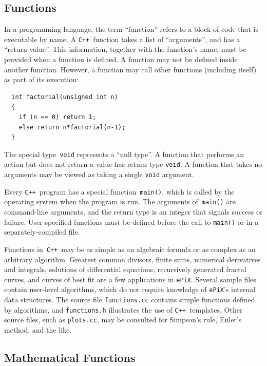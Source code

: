 \documentclass[12pt,letterpaper]{book}
\newcommand{\code}[1]{\texttt{#1}}
\newcommand{\filename}[1]{\texttt{#1}}
\newcommand{\ePiX}{\code{ePiX}}
\newcommand{\CXX}{\code{C++}}
\begin{document}
\subsection{Functions}

In a programming language, the term ``function'' refers to a block of
code that is executable by name.  A \CXX\ function takes a list of
``arguments'', and has a ``return value''.  This information, together
with the function's name, must be provided when a function is defined.
A function may not be defined inside another function. However, a
function may call other functions (including itself) as part of its
execution:
\begin{verbatim}
  int factorial(unsigned int n)
  {
    if (n == 0) return 1;
    else return n*factorial(n-1);
  }
\end{verbatim}

\index{Function!returning \code{void}}
The special type~\code{void} represents a ``null type''. A function
that performs an action but does not return a value has return type
\code{void}. A function that takes no arguments may be viewed as
taking a single \code{void} argument.

Every \CXX\ program has a special function~\code{main()}, which is
called by the operating system when the program is run. The arguments
of~\code{main()} are command-line arguments, and the return type is an
integer that signals success or failure. User-specified functions must
be defined before the call to \code{main()} or in a
separately-compiled file.

Functions in~\CXX\ may be as simple as an algebraic formula or as
complex as an arbitrary algorithm. Greatest common divisors, finite
sums, numerical derivatives and integrals, solutions of differential
equations, recursively generated fractal curves, and curves of best
fit are a few applications in \ePiX. Several sample files contain
user-level algorithms, which do not require knowledge of \ePiX's
internal data structures. The source file \filename{functions.cc}
contains simple functions defined by algorithms, and
\filename{functions.h} illustrates the use of \CXX\ templates. Other
source files, such as \filename{plots.cc}, may be consulted for
Simpson's rule, Euler's method, and the like.


\subsection{Mathematical Functions}
\end{document}

